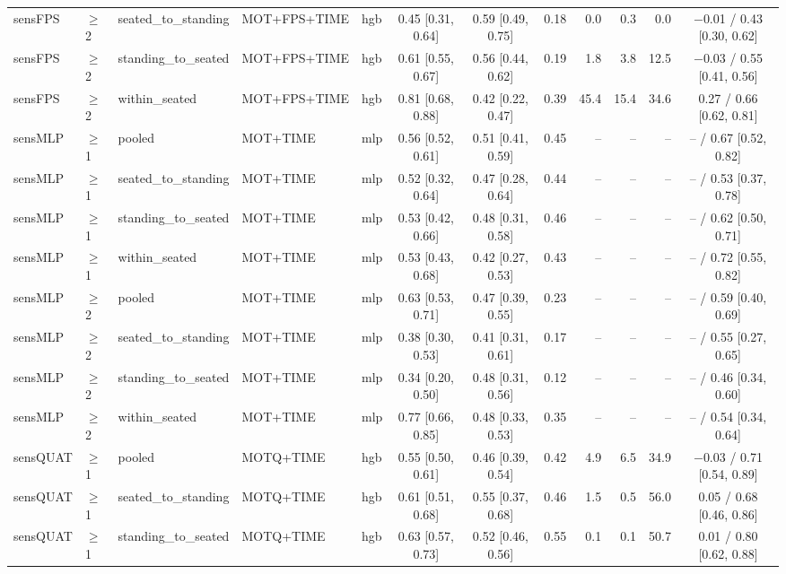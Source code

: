 \begin{longtable}{@{}lllllcccrrrc@{}}
sensFPS & $\geq$2 & seated\_to\_standing & MOT+FPS+TIME & hgb & 0.45 [0.31, 0.64] & 0.59 [0.49, 0.75] & 0.18 & 0.0 & 0.3 & 0.0 & $-$0.01 / 0.43 [0.30, 0.62] \\
sensFPS & $\geq$2 & standing\_to\_seated & MOT+FPS+TIME & hgb & 0.61 [0.55, 0.67] & 0.56 [0.44, 0.62] & 0.19 & 1.8 & 3.8 & 12.5 & $-$0.03 / 0.55 [0.41, 0.56] \\
sensFPS & $\geq$2 & within\_seated & MOT+FPS+TIME & hgb & 0.81 [0.68, 0.88] & 0.42 [0.22, 0.47] & 0.39 & 45.4 & 15.4 & 34.6 & 0.27 / 0.66 [0.62, 0.81] \\
sensMLP & $\geq$1 & pooled & MOT+TIME & mlp & 0.56 [0.52, 0.61] & 0.51 [0.41, 0.59] & 0.45 & -- & -- & -- & -- / 0.67 [0.52, 0.82] \\
sensMLP & $\geq$1 & seated\_to\_standing & MOT+TIME & mlp & 0.52 [0.32, 0.64] & 0.47 [0.28, 0.64] & 0.44 & -- & -- & -- & -- / 0.53 [0.37, 0.78] \\
sensMLP & $\geq$1 & standing\_to\_seated & MOT+TIME & mlp & 0.53 [0.42, 0.66] & 0.48 [0.31, 0.58] & 0.46 & -- & -- & -- & -- / 0.62 [0.50, 0.71] \\
sensMLP & $\geq$1 & within\_seated & MOT+TIME & mlp & 0.53 [0.43, 0.68] & 0.42 [0.27, 0.53] & 0.43 & -- & -- & -- & -- / 0.72 [0.55, 0.82] \\
sensMLP & $\geq$2 & pooled & MOT+TIME & mlp & 0.63 [0.53, 0.71] & 0.47 [0.39, 0.55] & 0.23 & -- & -- & -- & -- / 0.59 [0.40, 0.69] \\
sensMLP & $\geq$2 & seated\_to\_standing & MOT+TIME & mlp & 0.38 [0.30, 0.53] & 0.41 [0.31, 0.61] & 0.17 & -- & -- & -- & -- / 0.55 [0.27, 0.65] \\
sensMLP & $\geq$2 & standing\_to\_seated & MOT+TIME & mlp & 0.34 [0.20, 0.50] & 0.48 [0.31, 0.56] & 0.12 & -- & -- & -- & -- / 0.46 [0.34, 0.60] \\
sensMLP & $\geq$2 & within\_seated & MOT+TIME & mlp & 0.77 [0.66, 0.85] & 0.48 [0.33, 0.53] & 0.35 & -- & -- & -- & -- / 0.54 [0.34, 0.64] \\
sensQUAT & $\geq$1 & pooled & MOTQ+TIME & hgb & 0.55 [0.50, 0.61] & 0.46 [0.39, 0.54] & 0.42 & 4.9 & 6.5 & 34.9 & $-$0.03 / 0.71 [0.54, 0.89] \\
sensQUAT & $\geq$1 & seated\_to\_standing & MOTQ+TIME & hgb & 0.61 [0.51, 0.68] & 0.55 [0.37, 0.68] & 0.46 & 1.5 & 0.5 & 56.0 & 0.05 / 0.68 [0.46, 0.86] \\
sensQUAT & $\geq$1 & standing\_to\_seated & MOTQ+TIME & hgb & 0.63 [0.57, 0.73] & 0.52 [0.46, 0.56] & 0.55 & 0.1 & 0.1 & 50.7 & 0.01 / 0.80 [0.62, 0.88] \\

\end{longtable}
